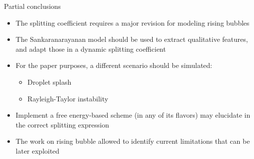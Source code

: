 \documentclass[8pt]{beamer}
\begin{document}
	\begin{frame}{Partial conclusions}
		\begin{itemize}
			\item The splitting coefficient requires a major revision for modeling rising bubbles 
			\item The Sankaranarayanan model should be used to extract qualitative features, and adapt those in a dynamic splitting coefficient
			\item For the paper purposes, a different scenario should be simulated:
			\begin{itemize}
				\item Droplet splash
				\item Rayleigh-Taylor instability  
			\end{itemize}
			\item Implement a free energy-based scheme (in any of its flavors) may elucidate in the correct splitting expression
			\item The work on rising bubble allowed to identify current limitations that can be later exploited 
		\end{itemize}
	\end{frame}
\end{document}
